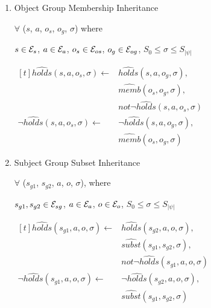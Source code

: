\documentclass[11pt, twocolumn]{article}
\begin{document}
\begin{enumerate}
              \item
                Object Group Membership Inheritance

                $\forall$ ($s$, $a$, $o_{s}$, $o_{g}$, $\sigma$) where

                $s \in {\cal E}_{s}$,
                $a \in {\cal E}_{a}$,
                $o_{s} \in {\cal E}_{os}$,
                $o_{g} \in {\cal E}_{og}$,
                $S_{0} \leq \sigma \leq S_{|\psi|}$

                \begin{math}
                  \begin{aligned}[t]
                    \hat{holds}(s, a, o_{s}, \sigma) \leftarrow &
                    \hat{holds}(s, a, o_{g}, \sigma), \\
                    & \hat{memb}(o_{s}, o_{g}, \sigma), \\
                    & not \lnot \hat{holds}(s, a, o_{s}, \sigma) \\
                    \lnot \hat{holds}(s, a, o_{s}, \sigma) \leftarrow &
                    \lnot \hat{holds}(s, a, o_{g}, \sigma), \\
                    & \hat{memb}(o_{s}, o_{g}, \sigma)
                  \end{aligned}
                \end{math}

              \item
                Subject Group Subset Inheritance

                $\forall$ ($s_{g1}$, $s_{g2}$, $a$, $o$, $\sigma$), where

                $s_{g1}, s_{g2} \in {\cal E}_{sg}$,
                $a \in {\cal E}_{a}$,
                $o \in {\cal E}_{o}$,
                $S_{0} \leq \sigma \leq S_{|\psi|}$

                \begin{math}
                  \begin{aligned}[t]
                    \hat{holds}(s_{g1}, a, o, \sigma) \leftarrow &
                    \hat{holds}(s_{g2}, a, o, \sigma), \\
                    & \hat{subst}(s_{g1}, s_{g2}, \sigma), \\
                    & not \lnot \hat{holds}(s_{g1}, a, o, \sigma) \\
                    \lnot \hat{holds}(s_{g1}, a, o, \sigma) \leftarrow &
                    \lnot \hat{holds}(s_{g2}, a, o, \sigma), \\
                    & \hat{subst}(s_{g1}, s_{g2}, \sigma)
                  \end{aligned}
                \end{math}


\end{enumerate}
\end{document}

